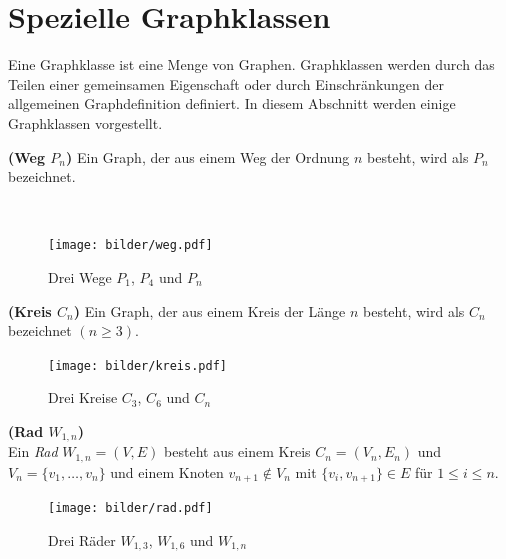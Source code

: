 \section{Spezielle Graphklassen}
\vspace{-3mm}
Eine Graphklasse ist eine Menge von Graphen. Graphklassen werden durch das Teilen einer gemeinsamen Eigenschaft oder durch Einschränkungen der allgemeinen Graphdefinition definiert. In diesem Abschnitt werden einige Graphklassen vorgestellt.

\begin{defi}{\textbf{(Weg $P_n$)}}\newline
Ein Graph, der aus einem Weg der Ordnung $n$ besteht, wird als $P_n$ bezeichnet. \end{defi}
\vspace{-13mm}
~\linebreak
\begin{figure}[h!]
		\centering 		 
   \texttt{[image: bilder/weg.pdf]}
	\caption{Drei Wege $P_1$, $P_4$ und $P_n$}
  	 \end{figure}
\vspace{-7mm}
\begin{defi}{\textbf{(Kreis $C_n$)}}\newline
Ein Graph, der aus einem Kreis der Länge $n$ besteht, wird als $C_n$ bezeichnet $(n \geq 3)$. \end{defi}
\vspace{-5mm}
\begin{figure}[h!]
		\centering 		 
   \texttt{[image: bilder/kreis.pdf]}
	\caption{Drei Kreise $C_3$, $C_6$ und $C_n$}
  	 \end{figure}
\vspace{-4mm}
\begin{defi}{\textbf{(Rad $W_{1,n}$)}}\\
Ein \emph{Rad} $W_{1,n}=(V,E)$ besteht aus einem Kreis $C_n=(V_n,E_n)$ und $V_n=\{v_1, \ldots ,v_n\}$ und einem Knoten $v_{n+1} \notin V_n$ mit $\{v_i, v_{n+1} \} \in E$ für $1 \leq i \leq n$. 
\end{defi}
\vspace{-5mm}
\begin{figure}[h!]
		\centering 		 
   \texttt{[image: bilder/rad.pdf]}
	\caption{Drei Räder $W_{1,3}$, $W_{1,6}$ und $W_{1,n}$}
  	 \end{figure}
  	 
